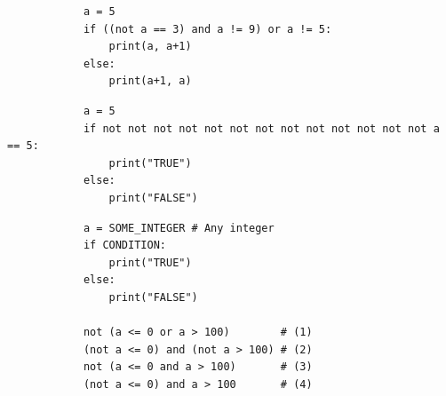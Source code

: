 \documentclass[dvipsnames, svgnames, x11names, handout]{beamer}
\begin{document}
\begin{frame}[fragile]{}
    \begin{center}
        \begin{verbatim}
            a = 5
            if ((not a == 3) and a != 9) or a != 5:
                print(a, a+1)
            else:
                print(a+1, a)
        \end{verbatim}
    \end{center}
\end{frame}

\begin{frame}[fragile]{}
    \begin{center}
        \begin{verbatim}
            a = 5
            if not not not not not not not not not not not not not a == 5:
                print("TRUE")
            else:
                print("FALSE")
        \end{verbatim}
    \end{center}
\end{frame}

\begin{frame}[fragile]{}
    \begin{center}
        \begin{verbatim}
            a = SOME_INTEGER # Any integer
            if CONDITION:
                print("TRUE")
            else:
                print("FALSE")
            
            not (a <= 0 or a > 100)        # (1)
            (not a <= 0) and (not a > 100) # (2)
            not (a <= 0 and a > 100)       # (3)
            (not a <= 0) and a > 100       # (4)
        \end{verbatim}
    \end{center}
\end{frame}
\end{document}
